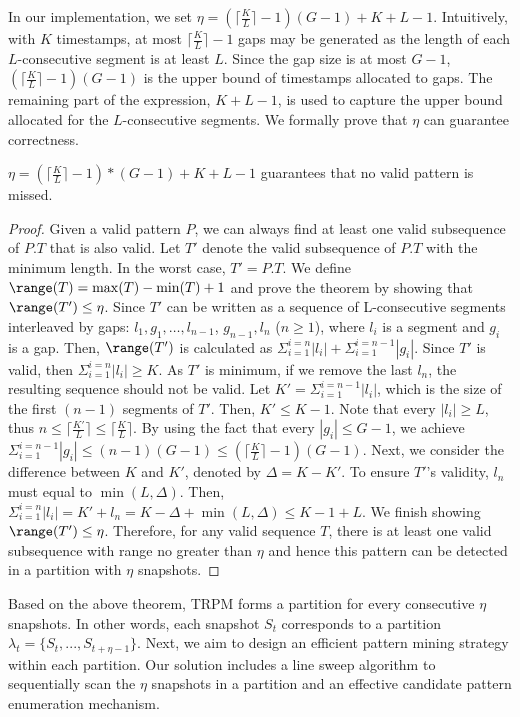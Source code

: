In our implementation, we set $\eta = (\lceil \frac{K}{L} \rceil - 1)(G-1)+K+L-1$. Intuitively, with $K$ timestamps, at most $\lceil \frac{K}{L} \rceil - 1$ gaps may be generated as the length of each $L$-consecutive segment is at least $L$. Since the gap size is at most $G-1$, $(\lceil \frac{K}{L} \rceil - 1)(G-1)$ is the upper bound of timestamps allocated to gaps. The remaining part of the expression, $K+L-1$, is used to capture the upper bound allocated for the $L$-consecutive segments. We formally prove that $\eta$ can guarantee correctness.


\begin{theorem}
\label{THM:RP_ETA}
$\eta = (\lceil \frac{K}{L} \rceil - 1)*(G-1)+K+L-1$ guarantees that no valid pattern is missed.
\end{theorem}

\begin{proof}
Given a valid pattern $P$, we can always find at least one valid subsequence of $P.T$ that is also valid. Let $T'$ denote the valid subsequence of $P.T$ with the minimum length. In the worst case, $T'=P.T$. We define $\range(T)=\max(T) - \min(T) +1$ and prove the theorem by showing that $\range(T') \leq \eta$.
Since $T'$ can be written as a sequence of L-consecutive segments interleaved by gaps: $l_1,g_1,\ldots,l_{n-1}$, $g_{n-1},l_n$ ($n \geq 1$),
where $l_i$ is a segment and $g_i$ is a gap. Then, $\range(T')$
is calculated as $\Sigma_{i=1}^{i=n}|l_i| + \Sigma_{i=1}^{i=n-1} |g_i|$. Since $T'$
is valid, then $\Sigma_{i=1}^{i=n}|l_i| \geq K$. As $T'$ is minimum, if we remove the 
last $l_n$, the resulting sequence should not be valid. Let $K' = \Sigma_{i=1}^{i=n-1}|l_i|$, which
is the size of the first $(n-1)$ segments of $T'$. Then, $K' \leq K-1$.
Note that every $|l_i| \geq L$, thus $n \leq \lceil \frac{K'}{L} \rceil \leq \lceil \frac{K}{L} \rceil $. By
using the fact that every $|g_i| \leq G-1$, we achieve $\Sigma_{i=1}^{i=n-1} |g_i| \leq (n-1)(G-1)
\leq (\lceil \frac{K}{L} \rceil -1)(G-1)$. Next, we consider the difference between $K$ and $K'$, denoted by
$\Delta = K- K'$. To ensure $T'$'s validity, $l_n$ must equal to $\min(L, \Delta)$.
Then, $\Sigma_{i=1}^{i=n}|l_i| = K' + l_n = K - \Delta + \min(L, \Delta) \leq K - 1 + L$. We finish showing $\range(T') \leq \eta$.  Therefore, for any valid sequence $T$, there is at least one valid subsequence with range no greater than $\eta$ and hence this pattern can be detected in a partition with $\eta$ snapshots.
\end{proof}

Based on the above theorem, TRPM forms a partition
for every consecutive $\eta$ snapshots.
In other words, each snapshot $S_t$ corresponds to a partition $\lambda_t=\{S_t,...,S_{t+\eta-1}\}$. 
Next, we aim to
design an efficient pattern mining strategy within each partition. Our solution includes a line sweep algorithm to sequentially scan the $\eta$ %
snapshots in a partition and an effective candidate pattern enumeration mechanism.  

